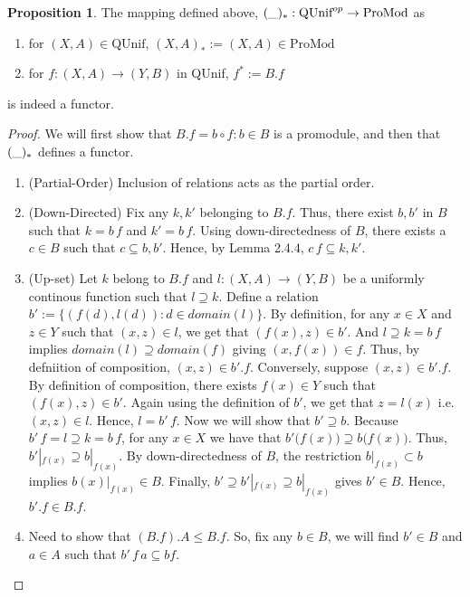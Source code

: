 \documentclass[18pt,a4paper]{article}
\theoremstyle{definition}
\newtheorem{proop}[theorem]{Proposition}
\begin{document}
		\begin{proop} The mapping defined above, $(\string _)_*:\text{QUnif}^{op} \to \text{ProMod}$ as
			\begin{enumerate}[label=(\alph*)]
				\item for $(X,A) \in \text{QUnif}$, $(X,A)_*:=(X,A) \in \text{ProMod}$
				\item for $f:(X,A) \to (Y,B)$ in QUnif,
					$f^* := B.f$
			\end{enumerate}
			is indeed a functor.
		\end{proop}
		\begin{proof}\setcounter{equation}{0}

			We will first show that $B.f={b \circ f: b \in B}$
			is a promodule, and then that $(\string _)_*$ defines a functor.
			\begin{enumerate}[label=(\roman*)]
				\item (Partial-Order) Inclusion of relations acts as the partial order.
				\item (Down-Directed) Fix any $k,k'$ belonging to $B.f$. Thus, there exist
					$b,b'$ in $B$ such that $k=b\,f$ and $k'=b\,f$. Using down-directedness
					of $B$, there exists a $c \in B$ such that $c \subseteq b,b'$. Hence,
					by Lemma 2.4.4, $c\,f \subseteq k,k'$.
				\item (Up-set) Let $k$ belong to $B.f$ and $l:(X,A) \to (Y,B)$ be a
					uniformly continous function such that $l \supseteq k$.
					Define a relation $b':= \{(f(d),l(d)): d \in domain(l) \}$.
					By definition, for any $x \in X$ and $z \in Y$ such that $(x,z) \in l$, we get that
					$(f(x),z)\in b'$. And $l \supseteq k=b\, f$ implies $domain(l)  \supseteq domain(f)$
					giving $(x,f(x)) \in f$. Thus, by defniition of composition,
					$(x,z) \in b'.f$. Conversely, suppose $(x,z) \in b'.f$.
					By definition of composition, there exists $f(x)\in Y$ such that
					$(f(x),z) \in b'$. Again using the definition of
					$b'$, we get that $z=l(x)$ i.e. $(x,z)\in l$. Hence, $l=b'\, f$.
					Now we will show that $b'\supseteq b$. Because $b'\, f=l \supseteq k=b\, f$, for any
					$x\in X$ we have that $b'\big(f(x)\big) \supseteq b\big(f(x)\big)$. Thus,
					$b'|_{f(x)} \supseteq b|_{f(x)}$. By down-directedness of $B$,
					the restriction $b|_{f(x)} \subset b$ implies $ b(x)|_{f(x)} \in B$.
					Finally, $b' \supseteq b'|_{f(x)} \supseteq b|_{f(x)}$ gives $b' \in B$.
					Hence, $b'.f \in B.f$.
				\item Need to show that $(B.f).A \leq B.f$. So, fix any $b\in B$, we will find
					$b' \in B$ and $a\in A$ such that $b' \, f\,a \subseteq bf$.

\end{enumerate}
\end{proof}
\end{document}
